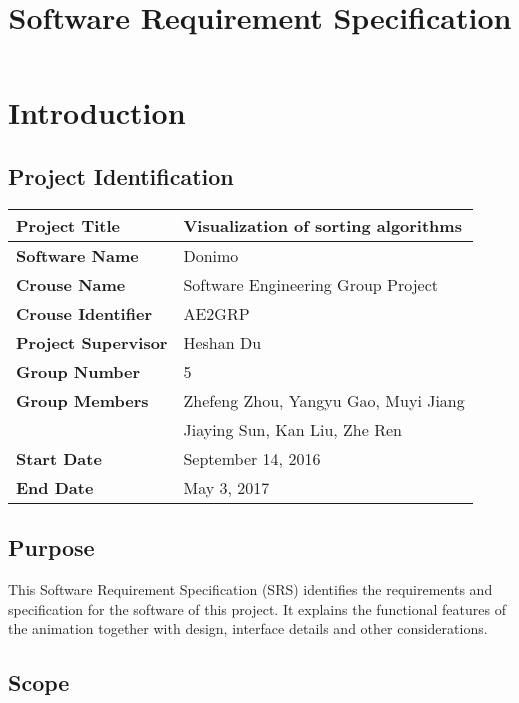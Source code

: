 \documentclass[12pt]{article}
\begin{document}
\title{Software Requirement Specification}
\author{}
\date{}
\maketitle

\section{Introduction}

\subsection{Project Identification}

\begin{table}[ht]
\begin{tabular}{|l|l|}
\hline 
\textbf{Project Title} & Visualization of sorting algorithms \\
\hline
\textbf{Software Name} & Donimo \\
\hline
\textbf{Crouse Name} & Software Engineering Group Project \\
\hline
\textbf{Crouse Identifier} & AE2GRP   \\
\hline
\textbf{Project Supervisor} & Heshan Du   \\ 
\hline
\textbf{Group Number} & 5     \\
\hline
\textbf{Group Members}&Zhefeng Zhou, Yangyu Gao, Muyi Jiang\\ &Jiaying Sun, Kan Liu, Zhe Ren\\
\hline
\textbf{Start Date} & September 14, 2016  \\ 
\hline
\textbf{End Date} & May 3, 2017   \\
\hline
\end{tabular}
\end{table}

\subsection{Purpose}

This Software Requirement Specification (SRS) identifies the requirements and specification for the software of this project. It explains the functional features of the animation together with design, interface details and other considerations.

\subsection{Scope}
\end{document}
